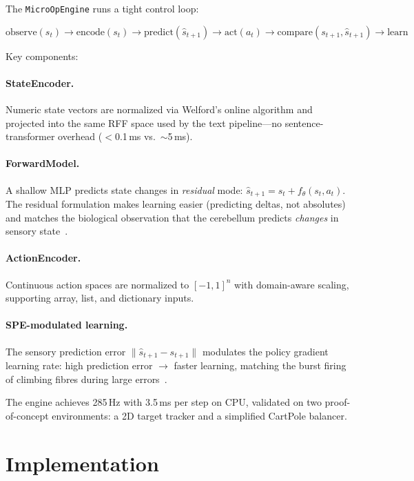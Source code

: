 \documentclass[11pt,a4paper]{article}
\begin{document}
The \texttt{MicroOpEngine} runs a tight control loop:

\begin{equation}
\text{observe}(s_t) \to \text{encode}(s_t) \to \text{predict}(\hat{s}_{t+1}) \to \text{act}(a_t) \to \text{compare}(s_{t+1}, \hat{s}_{t+1}) \to \text{learn}
\end{equation}

Key components:

\paragraph{StateEncoder.} Numeric state vectors are normalized via Welford's online algorithm and projected into the same RFF space used by the text pipeline---no sentence-transformer overhead ($<$0.1\,ms vs.\ $\sim$5\,ms).

\paragraph{ForwardModel.} A shallow MLP predicts state changes in \emph{residual} mode: $\hat{s}_{t+1} = s_t + f_\theta(s_t, a_t)$.
The residual formulation makes learning easier (predicting deltas, not absolutes) and matches the biological observation that the cerebellum predicts \emph{changes} in sensory state~\citep{wolpert1998internal}.

\paragraph{ActionEncoder.} Continuous action spaces are normalized to $[-1, 1]^n$ with domain-aware scaling, supporting array, list, and dictionary inputs.

\paragraph{SPE-modulated learning.} The sensory prediction error $\|\hat{s}_{t+1} - s_{t+1}\|$ modulates the policy gradient learning rate: high prediction error $\to$ faster learning, matching the burst firing of climbing fibres during large errors~\citep{tsay2025cerebellum}.

The engine achieves 285\,Hz with 3.5\,ms per step on CPU, validated on two proof-of-concept environments: a 2D target tracker and a simplified CartPole balancer.

\section{Implementation}\label{sec:implementation}
\end{document}
